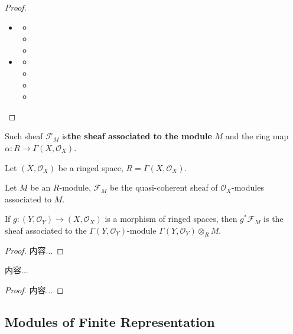 \documentclass[Total.tex]{subfiles}
\begin{document}
			\begin{proof}
				\begin{itemize}
					\item \begin{itemize}
						\item 
						\item 
						\item 
					\end{itemize}
					\item \begin{itemize}
						\item 
						\item 
						\item 
						\item 
					\end{itemize}
				\end{itemize}
			\end{proof}
			\begin{Def}
				Such sheaf $\mathcal{F}_M$ is\textbf{the sheaf associated to the module} $M$ and the ring map $\alpha:R\rightarrow \Gamma(X,\mathcal{O}_X)$.
			\end{Def}
			
			\begin{lemma}
				Let $(X,\mathcal{O}_X)$ be a ringed space, $R=\Gamma(X,\mathcal{O}_X)$.
				
				Let $M$ be an $R$-module, $\mathcal{F}_M$ be the quasi-coherent sheaf of $\mathcal{O}_X$-modules associated to $M$.
				
				If $g:(Y,\mathcal{O}_Y)\rightarrow (X,\mathcal{O}_X)$ is a morphism of ringed spaces, then $g^*\mathcal{F}_M$ is the sheaf associated to the $\Gamma(Y,\mathcal{O}_Y)$-module $\Gamma(Y,\mathcal{O}_Y)\otimes_R M$.
			\end{lemma}
			
			\begin{proof}
				内容...
			\end{proof}
			
			\begin{lemma}
				内容...
			\end{lemma}
			
			\begin{proof}
				内容...
			\end{proof}
			
			\subsection{Modules of Finite Representation}
			
\end{document}
